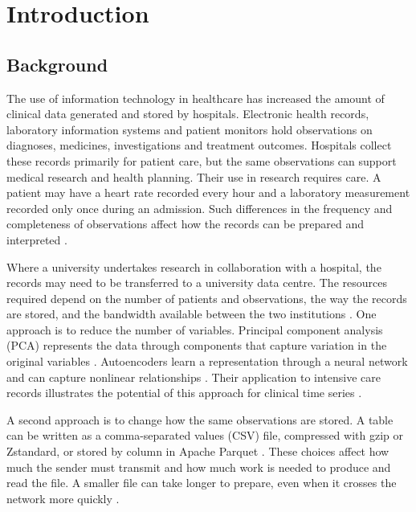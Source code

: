 \chapter{Introduction}\label{chap:introduction}

\section{Background}\label{background}
\noindent The use of information technology in healthcare has increased the amount of clinical data generated and stored by hospitals. Electronic health records, laboratory information systems and patient monitors hold observations on diagnoses, medicines, investigations and treatment outcomes. Hospitals collect these records primarily for patient care, but the same observations can support medical research and health planning. Their use in research requires care. A patient may have a heart rate recorded every hour and a laboratory measurement recorded only once during an admission. Such differences in the frequency and completeness of observations affect how the records can be prepared and interpreted \citep{Shickel2018,Tang2020}.

\noindent Where a university undertakes research in collaboration with a hospital, the records may need to be transferred to a university data centre. The resources required depend on the number of patients and observations, the way the records are stored, and the bandwidth available between the two institutions \citep{Lee2026}. One approach is to reduce the number of variables. Principal component analysis (PCA) represents the data through components that capture variation in the original variables \citep{Jolliffe2016}. Autoencoders learn a representation through a neural network and can capture nonlinear relationships \citep{Hinton2006}. Their application to intensive care records illustrates the potential of this approach for clinical time series \citep{Merkelbach2023}.

\noindent A second approach is to change how the same observations are stored. A table can be written as a comma-separated values (CSV) file, compressed with gzip or Zstandard, or stored by column in Apache Parquet \citep{Deutsch1996,Collet2021,Zeng2023}. These choices affect how much the sender must transmit and how much work is needed to produce and read the file. A smaller file can take longer to prepare, even when it crosses the network more quickly \citep{Kryukov2020}.

